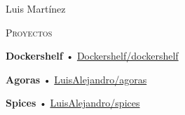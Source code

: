 \documentclass[12pt]{article}
\begin{document}
\begin{cv}{Luis Mart\'inez}
\begin{minipage}[t]{0.35\textwidth}
    \vspace{0.25em}
    \begin{minipage}{\linewidth}
      \textrm{\textsc{\Large{Proyectos}}}
      \newline
      \parbox[t]{\linewidth}{
        \textbf{Dockershelf} • \href{https://github.com/Dockershelf/dockershelf}{Dockershelf/dockershelf}\\
      }
      \parbox[t]{\linewidth}{
        \textbf{Agoras} • \href{https://github.com/LuisAlejandro/agoras}{LuisAlejandro/agoras}\\
      }
      \parbox[t]{\linewidth}{
        \textbf{Spices} • \href{https://github.com/LuisAlejandro/spices}{LuisAlejandro/spices}\\
      }
    \end{minipage}
  
  \end{minipage}\hspace{0.5cm}
  \begin{minipage}[t]{0.55\textwidth}
    \vspace{0.125em}


\end{minipage}
\end{cv}
\end{document}
